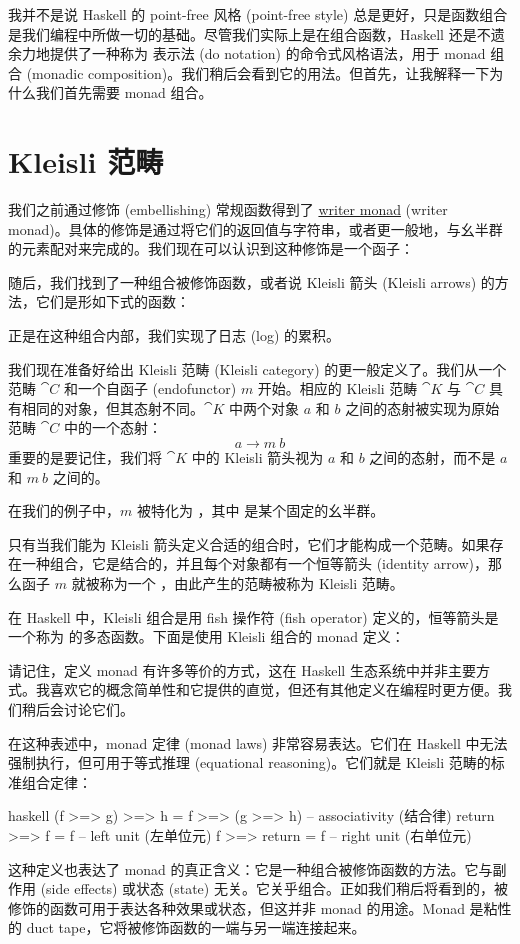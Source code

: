 我并不是说 Haskell 的 point-free 风格 (point-free style) 总是更好，只是函数组合是我们编程中所做一切的基础。尽管我们实际上是在组合函数，Haskell 还是不遗余力地提供了一种称为  表示法 (do notation) 的命令式风格语法，用于 monad 组合 (monadic composition)。我们稍后会看到它的用法。但首先，让我解释一下为什么我们首先需要 monad 组合。

\section{Kleisli 范畴}

我们之前通过修饰 (embellishing) 常规函数得到了 \hyperref[kleisli-categories]{writer monad} (writer monad)。具体的修饰是通过将它们的返回值与字符串，或者更一般地，与幺半群的元素配对来完成的。我们现在可以认识到这种修饰是一个函子：

随后，我们找到了一种组合被修饰函数，或者说 Kleisli 箭头 (Kleisli arrows) 的方法，它们是形如下式的函数：

正是在这种组合内部，我们实现了日志 (log) 的累积。

我们现在准备好给出 Kleisli 范畴 (Kleisli category) 的更一般定义了。我们从一个范畴 $\cat{C}$ 和一个自函子 (endofunctor) $m$ 开始。相应的 Kleisli 范畴 $\cat{K}$ 与 $\cat{C}$ 具有相同的对象，但其态射不同。$\cat{K}$ 中两个对象 $a$ 和 $b$ 之间的态射被实现为原始范畴 $\cat{C}$ 中的一个态射：
\[a \to m\ b\]
重要的是要记住，我们将 $\cat{K}$ 中的 Kleisli 箭头视为 $a$ 和 $b$ 之间的态射，而不是 $a$ 和 $m\ b$ 之间的。

在我们的例子中，$m$ 被特化为 ，其中  是某个固定的幺半群。

只有当我们能为 Kleisli 箭头定义合适的组合时，它们才能构成一个范畴。如果存在一种组合，它是结合的，并且每个对象都有一个恒等箭头 (identity arrow)，那么函子 $m$ 就被称为一个 ，由此产生的范畴被称为 Kleisli 范畴。

在 Haskell 中，Kleisli 组合是用 fish 操作符 (fish operator) \code{>=>} 定义的，恒等箭头是一个称为  的多态函数。下面是使用 Kleisli 组合的 monad 定义：

请记住，定义 monad 有许多等价的方式，这在 Haskell 生态系统中并非主要方式。我喜欢它的概念简单性和它提供的直觉，但还有其他定义在编程时更方便。我们稍后会讨论它们。

在这种表述中，monad 定律 (monad laws) 非常容易表达。它们在 Haskell 中无法强制执行，但可用于等式推理 (equational reasoning)。它们就是 Kleisli 范畴的标准组合定律：

\begin{snip}{haskell}
(f >=> g) >=> h = f >=> (g >=> h) -- associativity (结合律)
return >=> f = f                  -- left unit (左单位元)
f >=> return = f                  -- right unit (右单位元)
\end{snip}
这种定义也表达了 monad 的真正含义：它是一种组合被修饰函数的方法。它与副作用 (side effects) 或状态 (state) 无关。它关乎组合。正如我们稍后将看到的，被修饰的函数可用于表达各种效果或状态，但这并非 monad 的用途。Monad 是粘性的 duct tape，它将被修饰函数的一端与另一端连接起来。

